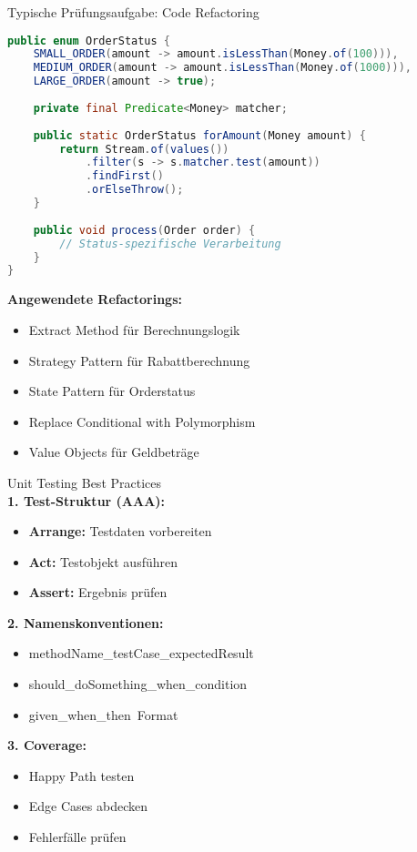 \begin{example2}[breakable]{Typische Prüfungsaufgabe: Code Refactoring}
\begin{lstlisting}[language=Java, style=base]
public enum OrderStatus {
    SMALL_ORDER(amount -> amount.isLessThan(Money.of(100))),
    MEDIUM_ORDER(amount -> amount.isLessThan(Money.of(1000))),
    LARGE_ORDER(amount -> true);
    
    private final Predicate<Money> matcher;
    
    public static OrderStatus forAmount(Money amount) {
        return Stream.of(values())
            .filter(s -> s.matcher.test(amount))
            .findFirst()
            .orElseThrow();
    }
    
    public void process(Order order) {
        // Status-spezifische Verarbeitung
    }
}
\end{lstlisting}

\textbf{Angewendete Refactorings:}
\begin{itemize}
    \item Extract Method für Berechnungslogik
    \item Strategy Pattern für Rabattberechnung
    \item State Pattern für Orderstatus
    \item Replace Conditional with Polymorphism
    \item Value Objects für Geldbeträge
\end{itemize}
\end{example2}

\begin{KR}{Unit Testing Best Practices}\\
\textbf{1. Test-Struktur (AAA):}
\begin{itemize}
    \item \textbf{Arrange:} Testdaten vorbereiten
    \item \textbf{Act:} Testobjekt ausführen
    \item \textbf{Assert:} Ergebnis prüfen
\end{itemize}

\textbf{2. Namenskonventionen:}
\begin{itemize}
    \item methodName\_testCase\_expectedResult
    \item should\_doSomething\_when\_condition
    \item given\_when\_then\ Format
\end{itemize}

\textbf{3. Coverage:}
\begin{itemize}
    \item Happy Path testen
    \item Edge Cases abdecken
    \item Fehlerfälle prüfen
\end{itemize}
\end{KR}

